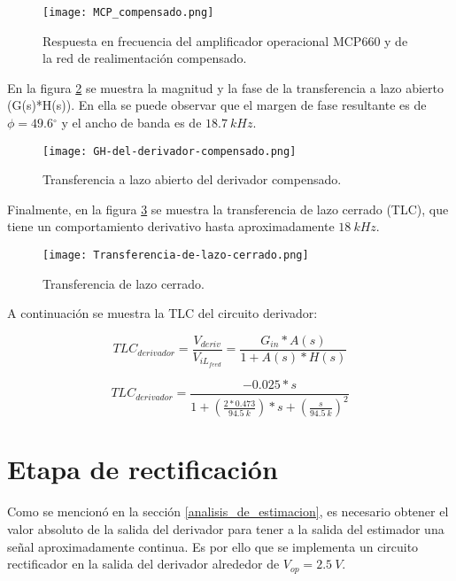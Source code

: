 \begin{figure}[H]
	\centering
	\texttt{[image: MCP\_compensado.png]}
	\caption{Respuesta en frecuencia del amplificador operacional MCP660 y de la red de realimentación compensado.}
	\label{fig:img_MCP_compensado}
\end{figure}

En la figura \ref{fig:img_GH del derivador compensado} se muestra la magnitud y la fase de la transferencia a lazo abierto (G(s)*H(s)). En ella se puede observar que el margen de fase resultante es de $\phi =49.6{}^\circ $ y el ancho de banda es de $18.7\:kHz$.

\begin{figure}[H]
	\centering
	\texttt{[image: GH-del-derivador-compensado.png]}
	\caption{Transferencia a lazo abierto del derivador compensado.}
	\label{fig:img_GH del derivador compensado}
\end{figure}

Finalmente, en la figura \ref{fig:img_Transferencia-de-lazo-cerrado} se muestra la transferencia de lazo cerrado (TLC), que tiene un comportamiento derivativo hasta aproximadamente $18 \:kHz$. 


\begin{figure}[H]
	\centering
	\texttt{[image: Transferencia-de-lazo-cerrado.png]}
	\caption{Transferencia de lazo cerrado.}
	\label{fig:img_Transferencia-de-lazo-cerrado}
\end{figure}


A continuación se muestra la TLC del circuito derivador:

\begin{equation} \label{eq_TLC_derivador}
	{TLC}_{derivador}=\frac{V_{deriv}}{V_{iL_{feed}}}=\frac{G_{in}*A(s)}{1+A(s)*H(s)}
\end{equation} 

\begin{equation} \label{eq_TLC_derivador}
	{TLC}_{derivador}=\frac{-0.025*s}{1+(\frac{2*0.473}{94.5\: k})*s+(\frac{s}{94.5\:k})^2}
\end{equation} 

\section{Etapa de rectificación}

Como se mencionó en la sección \ref{analisis_de_estimacion}, es necesario obtener el valor absoluto de la salida del derivador para tener a la salida del estimador una señal aproximadamente continua. Es por ello que se implementa un circuito rectificador en la salida del derivador alrededor de $V_{op}=2.5\:V$.

